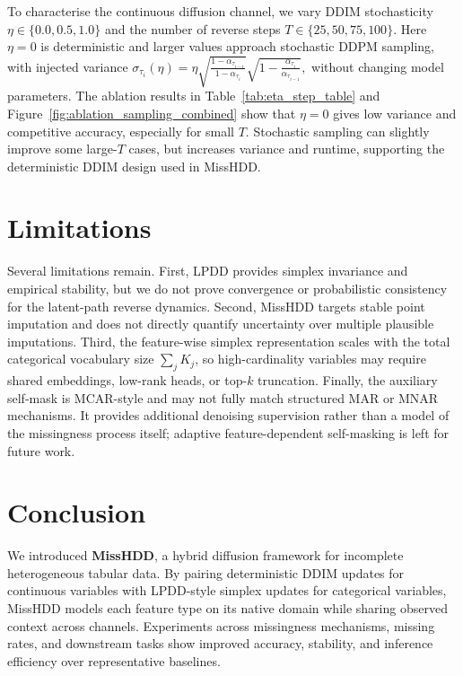 \documentclass[times, review, 10pt]{elsarticle}
\begin{document}
To characterise the continuous diffusion channel, we vary DDIM stochasticity
$\eta \in \{0.0, 0.5, 1.0\}$ and the number of reverse steps
$T \in \{25, 50, 75, 100\}$. Here $\eta{=}0$ is deterministic and larger
values approach stochastic DDPM sampling, with injected variance
$
\sigma_{\tau_i}(\eta)
= \eta
\sqrt{\frac{1 - \alpha_{\tau_{i-1}}}{1 - \alpha_{\tau_i}}}
\sqrt{1 - \frac{\alpha_{\tau_i}}{\alpha_{\tau_{i-1}}}},
$
without changing model parameters. The ablation results in
Table~\ref{tab:eta_step_table} and Figure~\ref{fig:ablation_sampling_combined}
show that $\eta{=}0$ gives low
variance and competitive accuracy, especially for small $T$. Stochastic
sampling can slightly improve some large-$T$ cases, but increases variance and
runtime, supporting the deterministic DDIM design used in MissHDD.

\section{Limitations}

Several limitations remain. First, LPDD provides simplex invariance and
empirical stability, but we do not prove convergence or probabilistic
consistency for the latent-path reverse dynamics. Second, MissHDD targets
stable point imputation and does not directly quantify uncertainty over
multiple plausible imputations. Third, the feature-wise simplex representation
scales with the total categorical vocabulary size \(\sum_j K_j\), so
high-cardinality variables may require shared embeddings, low-rank heads, or
top-$k$ truncation. Finally, the auxiliary self-mask is MCAR-style and may not
fully match structured MAR or MNAR mechanisms. It provides additional
denoising supervision rather than a model of the missingness process itself;
adaptive feature-dependent self-masking is left for future work.

\section{Conclusion}

We introduced \textbf{MissHDD}, a hybrid diffusion framework for incomplete
heterogeneous tabular data. By pairing deterministic DDIM updates for
continuous variables with LPDD-style simplex updates for categorical variables,
MissHDD models each feature type on its native domain while sharing observed
context across channels. Experiments across missingness mechanisms, missing
rates, and downstream tasks show improved accuracy, stability, and inference
efficiency over representative baselines.
\end{document}
